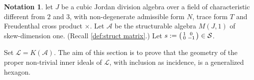 \documentclass[oneside,a4paper]{amsart} %
\theoremstyle{definition}
\newtheorem{notation}[theorem]{Notation}
\newcommand{\A}{\mathcal{A}}
\renewcommand{\SS}{\mathcal{S}}
\newcommand{\LL}{\mathcal{L}}
\numberwithin{equation}{section}
\begin{document}
\begin{notation}\label{notation sec 7}
	let $J$ be a cubic Jordan division algebra over a field of characteristic different from $2$ and $3$, with non-degenerate admissible form $N$, trace form $T$ and Freudenthal cross product $\times$. 
	Let $\A$ be the structurable algebra $M(J,1)$ of skew-dimension one. (Recall \cref{def:struct matrix}.)
	Let $s := \begin{psmallmatrix} 1 & 0 \\ 0 & -1 \end{psmallmatrix} \in \SS$.
\end{notation}

	Set $\LL=K(\A)$. 
	The aim of this section is to prove that the geometry of the proper non-trivial inner ideals of $\LL$, with inclusion as incidence, is a generalized hexagon.
\end{document}
